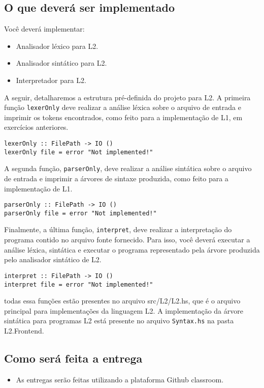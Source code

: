 \documentclass[a4paper,11pt]{article}
\begin{document}
\subsection*{O que deverá ser implementado}
\label{sec:orgfbacecc}

Você deverá implementar:

\begin{itemize}
\item Analisador léxico para L2.

\item Analisador sintático para L2.

\item Interpretador para L2.
\end{itemize}

A seguir, detalharemos a estrutura pré-definida do projeto para L2.
A primeira função \texttt{lexerOnly} deve realizar a análise léxica sobre o
arquivo de entrada e imprimir os tokens encontrados, como feito para a
implementação de L1, em exercícios anteriores.

\begin{verbatim}
lexerOnly :: FilePath -> IO ()
lexerOnly file = error "Not implemented!"
\end{verbatim}

A segunda função, \texttt{parserOnly}, deve realizar a análise sintática sobre o
arquivo de entrada e imprimir a árvores de sintaxe produzida, como feito para a
implementação de L1.

\begin{verbatim}
parserOnly :: FilePath -> IO ()
parserOnly file = error "Not implemented!"
\end{verbatim}

Finalmente, a última função, \texttt{interpret}, deve realizar a interpretação do programa
contido no arquivo fonte fornecido. Para isso, você deverá executar a análise léxica,
sintática e executar o programa representado pela árvore produzida pelo analisador
sintático de L2.

\begin{verbatim}
interpret :: FilePath -> IO ()
interpret file = error "Not implemented!"
\end{verbatim}

todas essa funções estão presentes no arquivo src/L2/L2.hs, que é o arquivo principal
para implementações da linguagem L2.
A implementação da árvore sintática para programas L2 está presente no arquivo \texttt{Syntax.hs}
na pasta L2.Frontend.
\subsection*{Como será feita a entrega}
\label{sec:org8b96cac}

\begin{itemize}
\item As entregas serão feitas utilizando a plataforma Github classroom.
\end{itemize}
\end{document}
